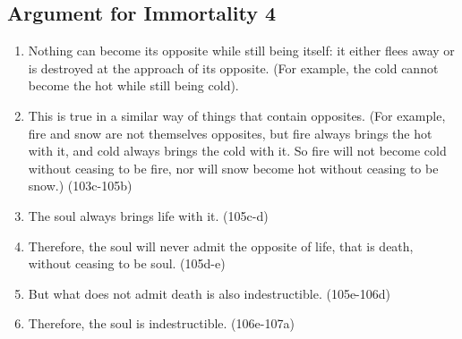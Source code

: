 \documentclass[oneside]{article}
\begin{document}
\subsection*{Argument for Immortality 4}
\begin{enumerate}
\item Nothing can become its opposite while still being itself: it either flees away or is destroyed at the approach of its opposite.  (For example, the cold cannot become the hot while still being cold). 
\item This is true in a similar way of things that contain opposites.  (For example, fire and snow are not themselves opposites, but fire always brings the hot with it, and cold always brings the cold with it.  So fire will not become cold without ceasing to be fire, nor will snow become hot without ceasing to be snow.) (103c-105b)
\item The soul always brings life with it. (105c-d)
\item Therefore, the soul will never admit the opposite of life, that is death, without ceasing to be soul. (105d-e)
\item But what does not admit death is also indestructible. (105e-106d)
\item  Therefore, the soul is indestructible. (106e-107a)
\end{enumerate}
\end{document}
